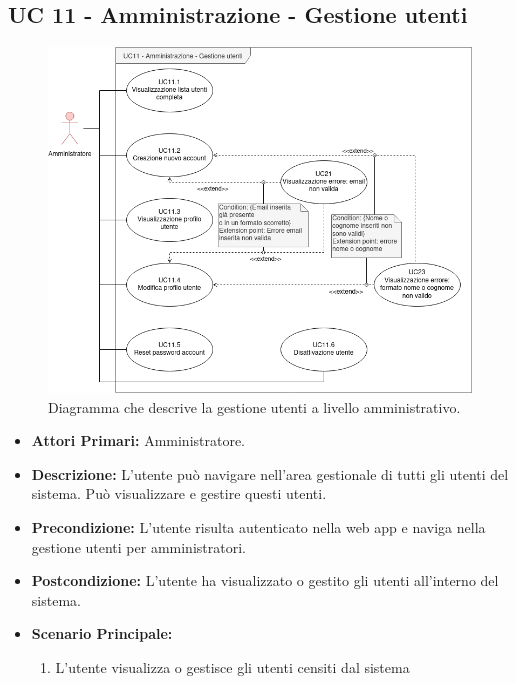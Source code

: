 \subsection{UC 11 - Amministrazione - Gestione utenti}

		\begin{figure}[H]
			\centering
			\includegraphics[scale=0.60]{res/images/uc11}
			\caption{Diagramma che descrive la gestione utenti a livello amministrativo.}
		\end{figure}

		\begin{itemize}
			\item \textbf{Attori Primari:} Amministratore.
			\item \textbf{Descrizione:} L'utente può navigare nell'area gestionale di tutti gli utenti del sistema. Può visualizzare e gestire questi utenti. 
			\item \textbf{Precondizione:} L'utente risulta autenticato nella web app e naviga nella gestione utenti per amministratori.
			\item \textbf{Postcondizione:} L'utente ha visualizzato o gestito gli utenti all'interno del sistema. 
			\item \textbf{Scenario Principale:}
			\begin{enumerate}
				\item{L'utente visualizza o gestisce gli utenti censiti dal sistema}
			\end{enumerate}	
		\end{itemize}

